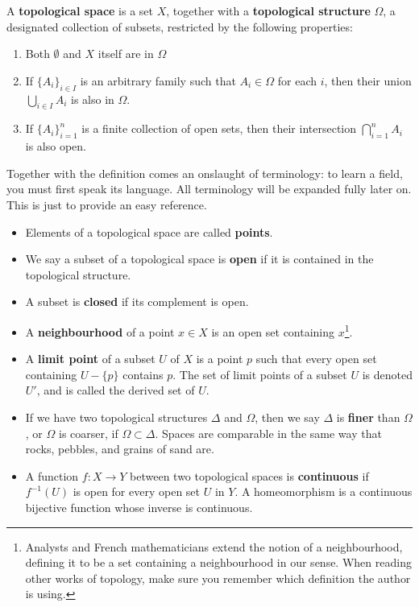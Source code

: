\begin{definition}
    A {\bf topological space} is a set $X$, together with a {\bf topological structure} $\Omega$, a designated collection of subsets, restricted by the following properties:
    \begin{enumerate}
        \item Both $\emptyset$ and $X$ itself are in $\Omega$
        \item If $\{A_i\}_{i \in I}$ is an arbitrary family such that $A_i \in \Omega$ for each $i$, then their union $\bigcup_{i \in I} A_i$ is also in $\Omega$.
        \item If $\{A_i\}_{i = 1}^n$ is a finite collection of open sets, then their intersection $\bigcap_{i = 1}^n A_i$ is also open.
    \end{enumerate}
\end{definition}

Together with the definition comes an onslaught of terminology: to learn a field, you must first speak its language. All terminology will be expanded fully later on. This is just to provide an easy reference.

\begin{itemize}
    \item Elements of a topological space are called {\bf points}.
    \item We say a subset of a topological space is {\bf open} if it is contained in the topological structure.
    \item A subset is {\bf closed} if its complement is open.
    \item A {\bf neighbourhood} of a point $x \in X$ is an open set containing $x$\footnote{Analysts and French mathematicians extend the notion of a neighbourhood, defining it to be a set containing a neighbourhood in our sense. When reading other works of topology, make sure you remember which definition the author is using.}.
    \item A {\bf limit point} of a subset $U$ of $X$ is a point $p$ such that every open set containing $U - \{p\}$ contains $p$. The set of limit points of a subset $U$ is denoted $U'$, and is called the derived set of $U$.
    \item If we have two topological structures $\Delta$ and $\Omega$, then we say $\Delta$ is {\bf finer} than $\Omega$, or $\Omega$ is coarser, if $\Omega \subset \Delta$. Spaces are comparable in the same way that rocks, pebbles, and grains of sand are.
    \item A function $f:X \to Y$ between two topological spaces is {\bf continuous} if $f^{-1}(U)$ is open for every open set $U$ in $Y$. A homeomorphism is a continuous bijective function whose inverse is continuous.
\end{itemize}

